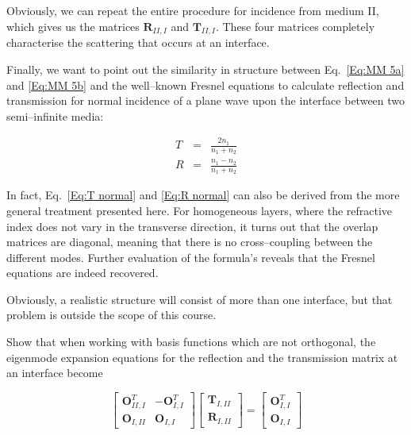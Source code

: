 Obviously, we can repeat the entire procedure for incidence from medium II,
which gives us the matrices $\mathbf{R}_{II,I}$ and $\mathbf{T}_{II,I}$.
These four matrices completely characterise the scattering that occurs at an
interface.

Finally, we want to point out the similarity in structure between Eq.~\ref{Eq:MM 5a}
and \ref{Eq:MM 5b} and the well--known Fresnel equations to calculate reflection
and transmission for normal incidence of a plane wave upon the interface between
two semi--infinite media:

\begin{eqnarray}
T & = & \frac{2n_{1}}{n_{1}+n_{2}}\label{Eq:T normal} \\
R & = & \frac{n_{1}-n_{2}}{n_{1}+n_{2}}\label{Eq:R normal} 
\end{eqnarray}

In fact, Eq.~\ref{Eq:T normal} and \ref{Eq:R normal} can also be derived
from the more general treatment presented here. For homogeneous layers, where
the refractive index does not vary in the transverse direction, it turns out
that the overlap matrices are diagonal, meaning that there is no cross--coupling
between the different modes. Further evaluation of the formula's reveals that
the Fresnel equations are indeed recovered.

Obviously, a realistic structure will consist of more than one interface, but that problem is outside the scope of this course.

\begin{sidebar}
\begin{ex}
Show that when working with basis functions which are not orthogonal, the eigenmode expansion equations for the reflection and the transmission matrix at an interface become

$$ \begin{bmatrix} \mathbf{O}^{T}_{II,I} & -\mathbf{O}^{T}_{I,I} \\ \mathbf{O}_{I,II} & \mathbf{O}_{I,I} \end{bmatrix} \begin{bmatrix} \mathbf{T}_{I,II} \\ \mathbf{R}_{I,II} \end{bmatrix} =  \begin{bmatrix} \mathbf{O}^{T}_{I,I} \\ \mathbf{O}_{I,I} \end{bmatrix} $$

\end{ex}
\end{sidebar}

